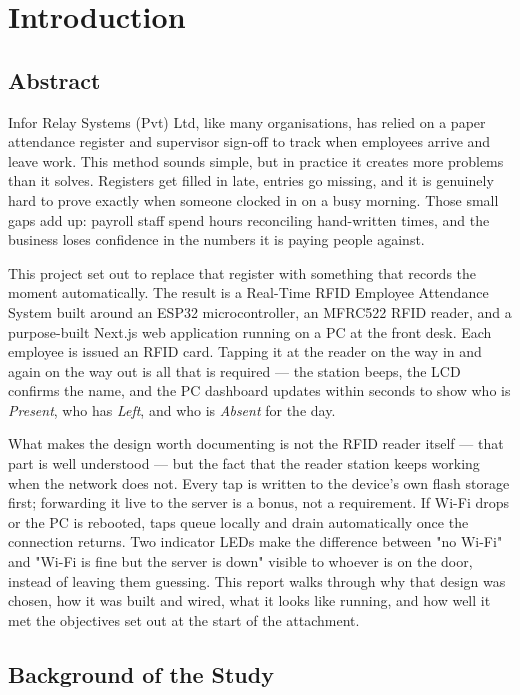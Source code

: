 \chapter{Introduction}
\label{ch:introduction}

\section{Abstract}

Infor Relay Systems (Pvt) Ltd, like many organisations, has relied on a paper attendance register and supervisor sign-off to track when employees arrive and leave work. This method sounds simple, but in practice it creates more problems than it solves. Registers get filled in late, entries go missing, and it is genuinely hard to prove exactly when someone clocked in on a busy morning. Those small gaps add up: payroll staff spend hours reconciling hand-written times, and the business loses confidence in the numbers it is paying people against.

This project set out to replace that register with something that records the moment automatically. The result is a Real-Time RFID Employee Attendance System built around an ESP32 microcontroller, an MFRC522 RFID reader, and a purpose-built Next.js web application running on a PC at the front desk. Each employee is issued an RFID card. Tapping it at the reader on the way in and again on the way out is all that is required — the station beeps, the LCD confirms the name, and the PC dashboard updates within seconds to show who is \textit{Present}, who has \textit{Left}, and who is \textit{Absent} for the day.

What makes the design worth documenting is not the RFID reader itself — that part is well understood — but the fact that the reader station keeps working when the network does not. Every tap is written to the device's own flash storage first; forwarding it live to the server is a bonus, not a requirement. If Wi-Fi drops or the PC is rebooted, taps queue locally and drain automatically once the connection returns. Two indicator LEDs make the difference between "no Wi-Fi" and "Wi-Fi is fine but the server is down" visible to whoever is on the door, instead of leaving them guessing. This report walks through why that design was chosen, how it was built and wired, what it looks like running, and how well it met the objectives set out at the start of the attachment.

\section{Background of the Study}

